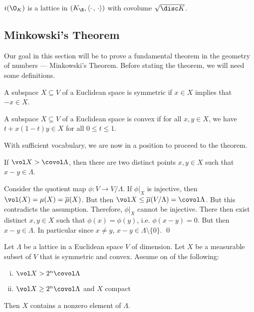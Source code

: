 \begin{prop}
$i(\O_K)$ is a lattice in $(K_\R, \langle \cdot\,,\, \cdot \rangle)$ with covolume $\sqrt{\disc K}$. 
\end{prop}



\subsection{Minkowski's Theorem}



Our goal in this section will be to prove a fundamental theorem in the geometry of numbers --- Minkowski's Theorem. Before stating the theorem, we will need some definitions. 

\begin{dfn}[Symmetric]
A subspace $X \subseteq V$ of a Euclidean space is symmetric if $x \in X$ implies that $-x \in X$. 
\end{dfn}

\begin{dfn}[Convex]
A subspace $X \subseteq V$ of a Euclidean space is convex if for all $x,y \in X$, we have $t+x(1-t)y \in X$ for all $0 \leq t \leq 1$. 
\end{dfn}

With sufficient vocabulary, we are now in a position to proceed to the theorem.

\begin{lem}\label{lem:mink}
If $\vol X>\covol  \Lambda$, then there are two distinct points $x,y \in X$ such that $x-y \in \Lambda$.
\end{lem}

\pf Consider the quotient map $\phi: V \to V/\Lambda$. If $\phi\big|_X$ is injective, then $\vol(X)=\mu(X)=\overline{\mu}(X)$. But then $\vol X \leq \overline{\mu}(V/\Lambda)=\covol \Lambda$. But this contradicts the assumption. Therefore, $\phi\big|_X$ cannot be injective. There then exist distinct $x,y \in X$ such that $\phi(x)=\phi(y)$, i.e. $\phi(x-y)=0$. But then $x-y \in \Lambda$. In particular since $x \neq y$, $x-y \in \Lambda \setminus\{0\}$. \qed \\


\begin{thm} \label{thm:mink}
Let $\Lambda$ be a lattice in a Euclidean space $V$ of dimension. Let $X$ be a measurable subset of $V$ that is symmetric and convex. Assume on of the following:
\begin{enumerate}[(i)]
\item $\vol X> 2^n \covol\Lambda$ 
\item $\vol X \geq 2^n \covol \Lambda$ and $X$ compact
\end{enumerate}
Then $X$ contains a nonzero element of $\Lambda$. 
\end{thm}

